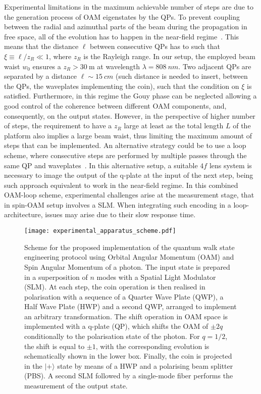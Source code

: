 Experimental limitations in the maximum achievable number of steps are due to the generation process of \ac{OAM} eigenstates by the \acp{QP}. To prevent coupling between the radial and azimuthal parts of the beam during the propagation in free space, all of the evolution has to happen in the near-field regime~\cite{karimi2009light,cardano2015quantum}. This means that the distance $\ell$ between consecutive \acp{QP} has to such that $\xi\equiv \ell/z_R \ll 1 $, where $z_R$ is the Rayleigh range.
In our setup, the employed beam waist $w_0$  ensures a $z_R> \SI{30}{\meter}$ at wavelength $\lambda=\SI{808}{nm}$. Two adjacent \acp{QP} are separated by a distance $\ell \sim \SI{15}{cm}$ (such distance is needed to insert, between the \acp{QP}, the waveplates implementing the coin), such that the condition on $\xi$ is satisfied.  Furthermore, in this regime the Gouy phase can be neglected allowing a good control of the coherence between different \ac{OAM} components, and, consequently, on the output states. However, in the perspective of higher number of steps, the requirement to have a $z_R$ large at least as the total length $L$ of the platform also implies a large beam waist, thus limiting the maximum amount of steps that can be implemented. An alternative strategy could be to use a loop scheme, where consecutive steps are performed by multiple passes through the same \ac{QP} and waveplates~\cite{goyal2013implementing}. In this alternative setup, a suitable $4f$ lens system is necessary to image the output of the q-plate at the input of the next step, being such approach equivalent to work in the near-field regime.  
In this combined \ac{OAM}-loop scheme, experimental challenges arise at the measurement stage, that in spin-\ac{OAM} setup involves a \ac{SLM}. When integrating such encoding in a loop-architecture, issues may arise due to their slow response time.

\begin{figure}[tb]
\centering
\texttt{[image: experimental\_apparatus\_scheme.pdf]}
\caption{
    Scheme for the proposed implementation of the quantum walk state engineering protocol using Orbital Angular Momentum (\ac{OAM}) and Spin Angular Momentum of a photon.
    The input state is prepared in a superposition of $n$ modes with a Spatial Light Modulator (SLM).
    At each step, the coin operation is then realised in polarisation with a sequence of a Quarter Wave Plate (QWP), a Half Wave Plate (HWP) and a second QWP, arranged to implement an arbitrary transformation.
    The shift operation in \ac{OAM} space is implemented with a q-plate (QP), which shifts the \ac{OAM} of $\pm 2q$ conditionally to the polarisation state of the photon.
    For $q=1/2$, the shift is equal to $\pm 1$, with the corresponding evolution is  schematically shown in the lower box.
    Finally, the coin is projected in the $\vert + \rangle$ state by means of a HWP and a polarising beam splitter (PBS).
    A second SLM followed by a single-mode fiber performs the measurement of the output state.
}
\label{fig:QWs:proposal_exp}
\end{figure}



